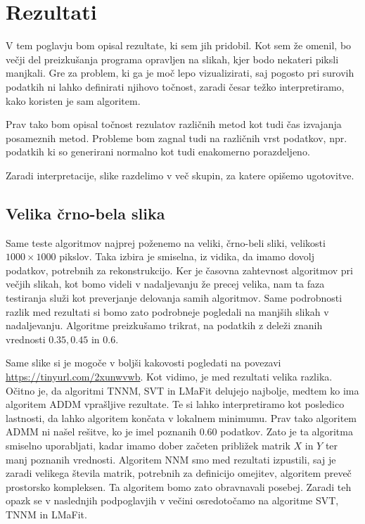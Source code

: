 \chapter{Rezultati}
V tem poglavju bom opisal rezultate, ki sem jih pridobil. Kot sem že omenil, bo večji del preizkušanja programa opravljen na slikah, kjer bodo nekateri piksli manjkali. Gre za problem, ki ga je moč lepo vizualizirati, saj pogosto pri surovih podatkih ni lahko definirati njihovo točnost, zaradi česar težko interpretiramo, kako koristen je sam algoritem.

Prav tako bom opisal točnost rezulatov različnih metod kot tudi čas izvajanja posameznih metod. Probleme bom zagnal tudi na različnih vrst podatkov, npr. podatkih ki so generirani normalno kot tudi enakomerno porazdeljeno.


Zaradi interpretacije, slike razdelimo v več skupin, za katere opišemo ugotovitve.

\section{Velika črno-bela slika}
Same teste algoritmov najprej poženemo na veliki, črno-beli sliki, velikosti $1000\times1000$ pikslov. Taka izbira je smiselna, iz vidika, da imamo dovolj podatkov, potrebnih za rekonstrukcijo. Ker je časovna zahtevnost algoritmov pri večjih slikah, kot bomo videli v nadaljevanju že precej velika, nam ta faza testiranja služi kot preverjanje delovanja samih algoritmov. Same podrobnosti razlik med rezultati si bomo zato podrobneje pogledali na manjših slikah v nadaljevanju. Algoritme preizkušamo trikrat, na podatkih z deleži znanih vrednosti $0.35, 0.45$ in $0.6$. 

\FloatBarrier

Same slike si je mogoče v boljši kakovosti pogledati na povezavi \url{https://tinyurl.com/2xunwvwb}. Kot vidimo, je med rezultati velika razlika. Očitno je, da algoritmi TNNM, SVT in LMaFit delujejo najbolje, medtem ko ima algoritem ADDM vprašljive rezultate. Te si lahko interpretiramo kot posledico lastnosti, da lahko algoritem končata v lokalnem minimumu. Prav tako algoritem ADMM ni našel rešitve, ko je imel poznanih $0.60$ podatkov. Zato je ta algoritma smiselno uporabljati, kadar imamo dober začeten približek matrik $X$ in $Y$ ter manj poznanih vrednosti. Algoritem NNM smo med rezultati izpustili, saj je zaradi velikega števila matrik, potrebnih za definicijo omejitev, algoritem preveč prostorsko kompleksen. Ta algoritem bomo zato obravnavali posebej. Zaradi teh opazk se v naslednjih podpoglavjih v večini osredotočamo na algoritme SVT, TNNM in LMaFit.


